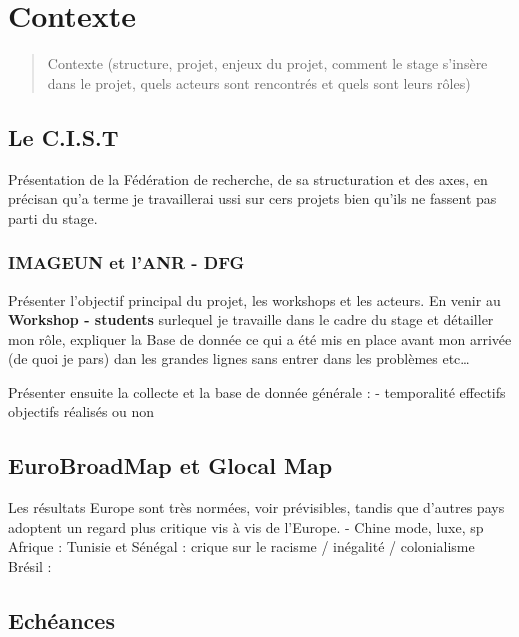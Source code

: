 \documentclass[
  12pt,
  a4paperpaper,
]{book}
\begin{document}
\hypertarget{contexte}{%
\chapter{Contexte}\label{contexte}}

\begin{quote}
Contexte (structure, projet, enjeux du projet, comment le stage s'insère
dans le projet, quels acteurs sont rencontrés et quels sont leurs rôles)
\end{quote}

\hypertarget{le-c.i.s.t}{%
\section{Le C.I.S.T}\label{le-c.i.s.t}}

Présentation de la Fédération de recherche, de sa structuration et des
axes, en précisan qu'a terme je travaillerai ussi sur cers projets bien
qu'ils ne fassent pas parti du stage.

\hypertarget{imageun-et-lanr---dfg}{%
\subsection{IMAGEUN et l'ANR - DFG}\label{imageun-et-lanr---dfg}}

Présenter l'objectif principal du projet, les workshops et les acteurs.
En venir au \textbf{Workshop - students} surlequel je travaille dans le
cadre du stage et détailler mon rôle, expliquer la Base de donnée ce qui
a été mis en place avant mon arrivée (de quoi je pars) dan les grandes
lignes sans entrer dans les problèmes etc\ldots{}

Présenter ensuite la collecte et la base de donnée générale : -
temporalité effectifs objectifs réalisés ou non

\hypertarget{eurobroadmap-et-glocal-map}{%
\section{EuroBroadMap et Glocal Map}\label{eurobroadmap-et-glocal-map}}

Les résultats Europe sont très normées, voir prévisibles, tandis que
d'autres pays adoptent un regard plus critique vis à vis de l'Europe. -
Chine mode, luxe, sp Afrique : Tunisie et Sénégal : crique sur le
racisme / inégalité / colonialisme Brésil :

\hypertarget{echuxe9ances}{%
\section{Echéances}\label{echuxe9ances}}
\end{document}
